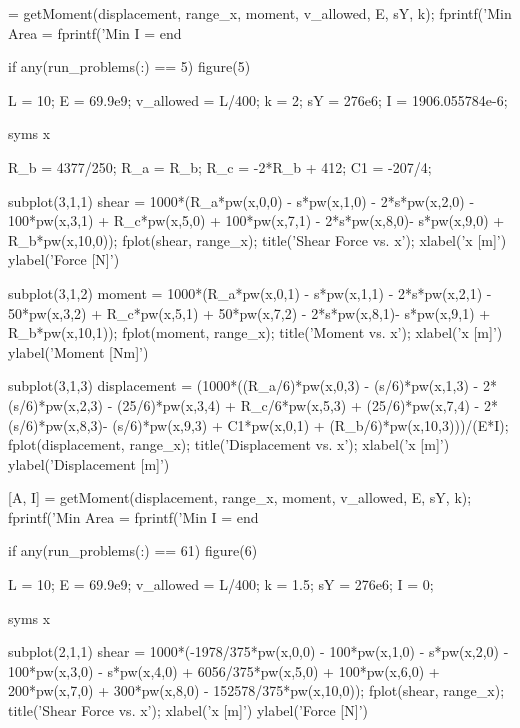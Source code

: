 \documentclass[a4paper]{article}
\begin{document}
\begin{verbatim*}
    [A, I] = getMoment(displacement, range_x, moment, v_allowed, E, sY, k);
    fprintf('Min Area = %
    fprintf('Min I = %
end


if any(run_problems(:) == 5)
    figure(5)

    L = 10; %
    E = 69.9e9; %
    v_allowed = L/400; %
    k = 2; %
    sY = 276e6; %
    I = 1906.055784e-6;

    syms x

    R_b = 4377/250;
    R_a = R_b;
    R_c = -2*R_b + 412;
    C1 = -207/4;
    
    
    subplot(3,1,1)
    shear = 1000*(R_a*pw(x,0,0) - s*pw(x,1,0) - 2*s*pw(x,2,0) - 100*pw(x,3,1) + R_c*pw(x,5,0) + 100*pw(x,7,1) - 2*s*pw(x,8,0)- s*pw(x,9,0) + R_b*pw(x,10,0));
    fplot(shear, range_x);
    title('Shear Force vs. x');
    xlabel('x [m]')
    ylabel('Force [N]')

    subplot(3,1,2)
    moment = 1000*(R_a*pw(x,0,1) - s*pw(x,1,1) - 2*s*pw(x,2,1) - 50*pw(x,3,2) + R_c*pw(x,5,1) + 50*pw(x,7,2) - 2*s*pw(x,8,1)- s*pw(x,9,1) + R_b*pw(x,10,1));
    fplot(moment, range_x);
    title('Moment vs. x');
    xlabel('x [m]')
    ylabel('Moment [Nm]')

    subplot(3,1,3)
    displacement = (1000*((R_a/6)*pw(x,0,3) - (s/6)*pw(x,1,3) - 2*(s/6)*pw(x,2,3) - (25/6)*pw(x,3,4) + R_c/6*pw(x,5,3) + (25/6)*pw(x,7,4) - 2*(s/6)*pw(x,8,3)- (s/6)*pw(x,9,3) + C1*pw(x,0,1) + (R_b/6)*pw(x,10,3)))/(E*I);
    fplot(displacement, range_x);
    title('Displacement vs. x');
    xlabel('x [m]')
    ylabel('Displacement [m]')

    [A, I] = getMoment(displacement, range_x, moment, v_allowed, E, sY, k);
    fprintf('Min Area = %
    fprintf('Min I = %
end


if any(run_problems(:) == 61)
    figure(6)

    L = 10; %
    E = 69.9e9; %
    v_allowed = L/400; %
    k = 1.5; %
    sY = 276e6; %
    I = 0; %

    syms x

    subplot(2,1,1)
    shear = 1000*(-1978/375*pw(x,0,0) - 100*pw(x,1,0) - s*pw(x,2,0) - 100*pw(x,3,0) - s*pw(x,4,0) + 6056/375*pw(x,5,0) + 100*pw(x,6,0) + 200*pw(x,7,0) + 300*pw(x,8,0) - 152578/375*pw(x,10,0));
    fplot(shear, range_x);
    title('Shear Force vs. x');
    xlabel('x [m]')
    ylabel('Force [N]')


\end{verbatim*}
\end{document}
